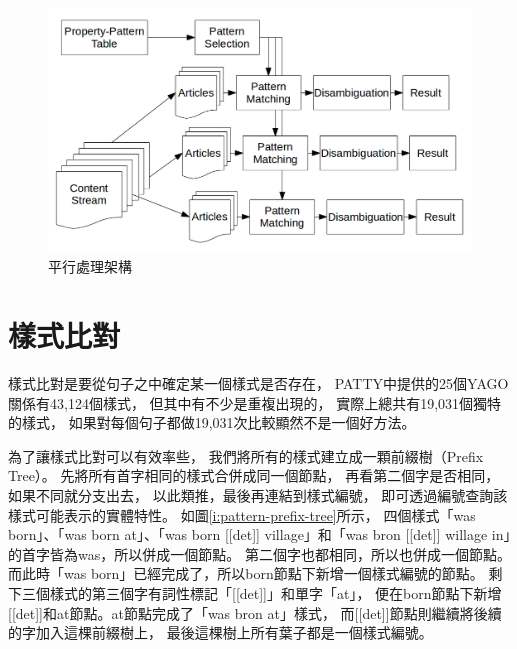 \begin{figure}
    \centering
    \includegraphics[width=1\textwidth]{images/03-pattern-parallel}
    \caption{平行處理架構}
    \label{i:process-parallel}
\end{figure}

\section{樣式比對}
\label{s:pattern-match}

樣式比對是要從句子之中確定某一個樣式是否存在，
PATTY中提供的25個YAGO關係有43,124個樣式，
但其中有不少是重複出現的，
實際上總共有19,031個獨特的樣式，
如果對每個句子都做19,031次比較顯然不是一個好方法。

為了讓樣式比對可以有效率些，
我們將所有的樣式建立成一顆前綴樹（Prefix Tree）。
先將所有首字相同的樣式合併成同一個節點，
再看第二個字是否相同，如果不同就分支出去，
以此類推，最後再連結到樣式編號，
即可透過編號查詢該樣式可能表示的實體特性。
如圖\ref{i:pattern-prefix-tree}所示，
四個樣式「was born」、「was born at」、「was born [[det]] village」和「was bron [[det]] willage in」的首字皆為was，所以併成一個節點。
第二個字也都相同，所以也併成一個節點。
而此時「was born」已經完成了，所以born節點下新增一個樣式編號的節點。
剩下三個樣式的第三個字有詞性標記「[[det]]」和單字「at」，
便在born節點下新增[[det]]和at節點。at節點完成了「was bron at」樣式，
而[[det]]節點則繼續將後續的字加入這棵前綴樹上，
最後這棵樹上所有葉子都是一個樣式編號。


